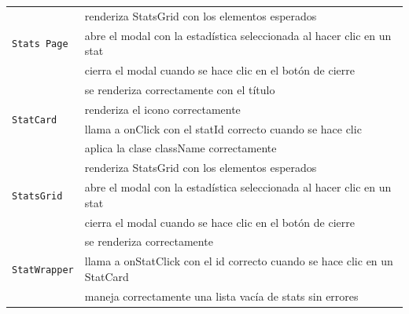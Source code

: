 \begin{longtable}{|p{5cm}|p{9cm}|}
  \multirow{3}{*}{\texttt{Stats Page}}            & renderiza StatsGrid con los elementos esperados                              \\ \cline{2-2}
                                                  & abre el modal con la estadística seleccionada al hacer clic en un stat       \\ \cline{2-2}
                                                  & cierra el modal cuando se hace clic en el botón de cierre                    \\ \hline

  \multirow{4}{*}{\texttt{StatCard}}              & se renderiza correctamente con el título                                     \\ \cline{2-2}
                                                  & renderiza el icono correctamente                                             \\ \cline{2-2}
                                                  & llama a onClick con el statId correcto cuando se hace clic                   \\ \cline{2-2}
                                                  & aplica la clase className correctamente                                      \\ \hline

  \multirow{3}{*}{\texttt{StatsGrid}}             & renderiza StatsGrid con los elementos esperados                              \\ \cline{2-2}
                                                  & abre el modal con la estadística seleccionada al hacer clic en un stat       \\ \cline{2-2}
                                                  & cierra el modal cuando se hace clic en el botón de cierre                    \\ \hline

  \multirow{3}{*}{\texttt{StatWrapper}}           & se renderiza correctamente                                                   \\ \cline{2-2}
                                                  & llama a onStatClick con el id correcto cuando se hace clic en un StatCard    \\ \cline{2-2}
                                                  & maneja correctamente una lista vacía de stats sin errores                    \\ \hline


\end{longtable}
